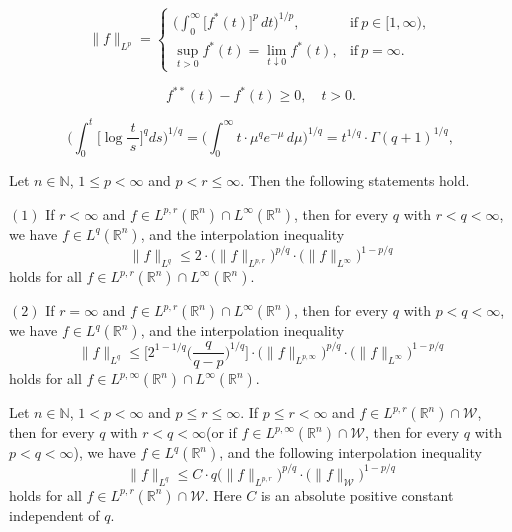 \documentclass[10pt,a4paper]{amsart}
\begin{document}
\begin{equation}\label{equality2}
\|f\|_{L^p}=
\begin{cases}
\displaystyle\bigg(\int_{0}^{\infty}\big[f^{*}(t)\big]^p\,dt\bigg)^{1/p}, &\mbox{if}~ p\in[1,\infty),\\
\displaystyle\sup_{t>0}f^{*}(t)=\lim_{t\downarrow 0}f^{*}(t), &\mbox{if}~ p=\infty.
\end{cases}
\end{equation}

\begin{equation}\label{geq}
f^{**}(t)-f^{*}(t)\geq 0,\quad t>0.
\end{equation}

\begin{equation}\label{weneed}
\bigg(\int_0^{t}\Big[\log\frac{t}{\,s\,}\Big]^qds\bigg)^{1/q}
=\bigg(\int_0^{\infty}t\cdot\mu^q e^{-\mu}\,d\mu\bigg)^{1/q}=t^{1/q}\cdot\Gamma(q+1)^{1/q},
\end{equation}

\begin{thm}\label{thmwang1}
Let $n\in \mathbb{N}$, $1\leq p<\infty$ and $p<r\leq\infty$. Then the following statements hold.

$(1)$ If $r<\infty$ and $f\in L^{p,r}(\mathbb R^n)\cap{L^\infty}(\mathbb R^n)$, then for every $q$ with $r<q<\infty$, we have $f\in L^q(\mathbb R^n)$, and the interpolation inequality
\begin{equation*}
\|f\|_{L^q}\leq 2\cdot\big(\|f\|_{L^{p,r}}\big)^{p/q}\cdot\big(\|f\|_{L^\infty}\big)^{1-p/q}
\end{equation*}
holds for all $f\in L^{p,r}(\mathbb R^n)\cap{L^\infty}(\mathbb R^n)$.

$(2)$ If $r=\infty$ and $f\in L^{p,r}(\mathbb R^n)\cap{L^\infty}(\mathbb R^n)$, then for every $q$ with $p<q<\infty$, we have $f\in L^q(\mathbb R^n)$, and the interpolation inequality
\begin{equation*}
\|f\|_{L^q}\leq \Big[2^{1-1/q}\Big(\frac{q}{q-p}\Big)^{1/q}\Big]
\cdot\big(\|f\|_{L^{p,\infty}}\big)^{p/q}\cdot\big(\|f\|_{L^\infty}\big)^{1-p/q}
\end{equation*}
holds for all $f\in L^{p,\infty}(\mathbb R^n)\cap{L^\infty}(\mathbb R^n)$.
\end{thm}

\begin{thm}\label{strong}
Let $n\in \mathbb{N}$, $1<p<\infty$ and $p\leq r\leq\infty$. If $p\leq r<\infty$ and $f\in L^{p,r}(\mathbb R^n)\cap \mathcal{W}$, then for every $q$ with $r<q<\infty$(or if $f\in L^{p,\infty}(\mathbb R^n)\cap \mathcal{W}$, then for every $q$ with $p<q<\infty$), we have $f\in L^q(\mathbb R^n)$, and the following interpolation inequality
\begin{equation*}
\|f\|_{L^q}\leq C\cdot q\big(\|f\|_{L^{p,r}}\big)^{p/q}\cdot\big(\|f\|_{\mathcal{W}}\big)^{1-p/q}
\end{equation*}
holds for all $f\in L^{p,r}(\mathbb R^n)\cap \mathcal{W}$. Here $C$ is an absolute positive constant independent of $q$.
\end{thm}
\end{document}
